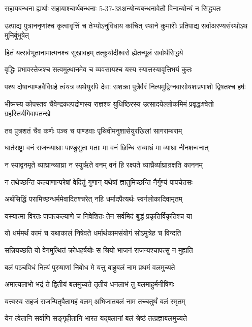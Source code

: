 \twolineshloka
{सहायबन्धना ह्यर्थाः सहायाश्चार्थबन्धनाः}
{5-37-38अन्योन्यबन्धनावेतौ विनान्योन्यं न सिद्ध्यतः}


\twolineshloka
{उत्पाद्य पुत्राननृणांश्च कृत्वावृत्तिं च तेभ्योऽनुविधाय कांचित्}
{स्थाने कुमारीः प्रतिपाद्य सर्वाअरण्यसंस्थोऽथ मुनिर्बुभूषेत्}


\twolineshloka
{हितं यत्सर्वभूतानामात्मनश्च सुखावहम्}
{तत्कुर्यादीश्वरो ह्येतन्मूलं सर्वार्थसिद्धये}


\twolineshloka
{वृद्धिः प्रभावस्तेजश्च सत्वमुत्थानमेव च}
{व्यवसायश्च यस्य स्यात्तस्यावृत्तिभयं कुतः}


\twolineshloka
{पश्य दोषान्पाण्डवैर्विग्रहे त्वंयत्र व्यथेयुरपि देवाः सशक्रा}
{पुत्रैर्वैरं नित्यमुद्विग्नवासोयशःप्रणाशो द्विषतश्च हर्षः}


\twolineshloka
{भीष्मस्य कोपस्तव चैवेन्द्रकल्पद्रोणस्य राज्ञश्च युधिष्ठिरस्य}
{उत्सादयेल्लोकमिमं प्रवृद्धःश्वेतो ग्रहस्तिर्यगिवापतन्खे}


\twolineshloka
{तव पुत्रशतं चैव कर्णः पञ्च च पाण्डवाः}
{पृथिवीमनुशासेयुरखिलां सागराम्बराम्}


\twolineshloka
{धार्तराष्ट्रा वनं राजन्व्याघ्राः पाण्डुसुता मताः}
{मा वनं छिन्धि सव्याघ्रं मा व्याघ्रा नीनशन्वनात्}


\twolineshloka
{न स्याद्वनमृते व्याघ्रान्व्याघ्रा न स्युर्ऋते वनम्}
{वनं हि रक्ष्यते व्याघ्रैर्व्याघ्रान्रक्षति काननम्}


\twolineshloka
{न तथेच्छन्ति कल्याणान्परेषां वेदितुं गुणान्}
{यथेषां ज्ञातुमिच्छन्ति नैर्गुण्यं पापचेतसः}


\twolineshloka
{अर्थसिद्धिं परामिच्छन्धर्ममेवादितश्चरेत्}
{नहि धर्मादपैत्यर्थः स्वर्गलोकादिवामृतम्}


\twolineshloka
{यस्यात्मा विरतः पापात्कल्याणे च निवेशितः}
{तेन सर्वमिदं बुद्धं प्रकृतिर्विकृतिश्च या}


\twolineshloka
{यो धर्ममर्थं कामं च यथाकालं निषेवते}
{धर्मार्थकामसंयोगं सोऽमुत्रेह च विन्दति}


\twolineshloka
{सन्नियच्छति यो वेगमुत्थितं क्रोधहर्षयोः}
{स श्रियो भाजनं राजन्यश्चापत्सु न मुह्यति}


\twolineshloka
{बलं पञ्चविधं नित्यं पुरुषाणां निबोध मे}
{यत्तु बाहुबलं नाम प्रथमं वलमुच्यते}


\twolineshloka
{अमात्यलाभो भद्रं ते द्वितीयं बलमुच्यते}
{तृतीयं धनलाभं तु बलमाहुर्मनीषिणः}


\twolineshloka
{यत्त्वस्य सहजं राजन्पितृपैतामहं बलम्}
{अभिजातबलं नाम तच्चतुर्थं बलं स्मृतम्}


\twolineshloka
{येन त्वेतानि सर्वाणि सङ्गृहीतानि भारत}
{यद्बलानां बलं श्रेष्ठं तत्प्रज्ञाबलमुच्यते}


